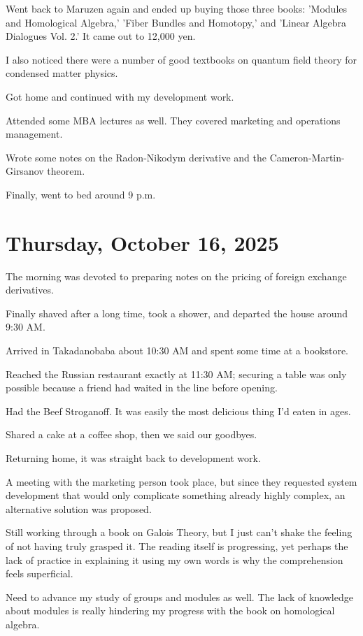 \documentclass[uplatex]{jsarticle}
\begin{document}
Went back to Maruzen again and ended up buying those three books: 'Modules and Homological Algebra,' 'Fiber Bundles and Homotopy,' and 'Linear Algebra Dialogues Vol. 2.' It came out to 12,000 yen.

I also noticed there were a number of good textbooks on quantum field theory for condensed matter physics.

Got home and continued with my development work.

Attended some MBA lectures as well. They covered marketing and operations management.

Wrote some notes on the Radon-Nikodym derivative and the Cameron-Martin-Girsanov theorem.

Finally, went to bed around 9 p.m.

\section{Thursday, October 16, 2025}

The morning was devoted to preparing notes on the pricing of foreign exchange derivatives.

Finally shaved after a long time, took a shower, and departed the house around 9:30 AM.

Arrived in Takadanobaba about 10:30 AM and spent some time at a bookstore.

Reached the Russian restaurant exactly at 11:30 AM; securing a table was only possible because a friend had waited in the line before opening.

Had the Beef Stroganoff. It was easily the most delicious thing I'd eaten in ages.

Shared a cake at a coffee shop, then we said our goodbyes.

Returning home, it was straight back to development work.

A meeting with the marketing person took place, but since they requested system development that would only complicate something already highly complex, an alternative solution was proposed.

Still working through a book on Galois Theory, but I just can't shake the feeling of not having truly grasped it. The reading itself is progressing, yet perhaps the lack of practice in explaining it using my own words is why the comprehension feels superficial.

Need to advance my study of groups and modules as well. The lack of knowledge about modules is really hindering my progress with the book on homological algebra.
\end{document}
